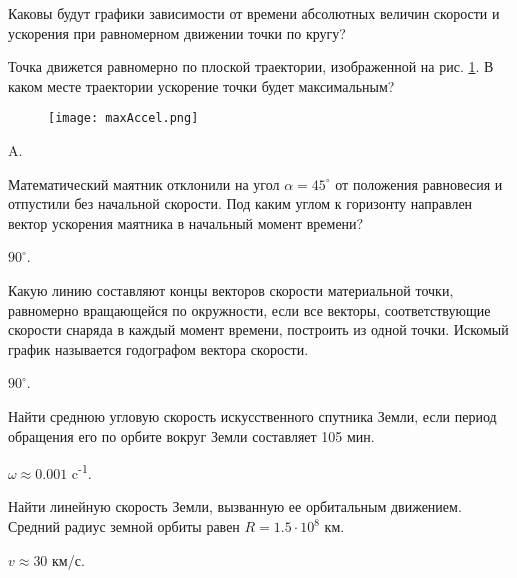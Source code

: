 \qualProblems

\begin{ex} %
Каковы будут графики зависимости от времени абсолютных величин скорости и ускорения при равномерном движении точки по кругу?
\end{ex}

\begin{ex} %
Точка движется равномерно по плоской траектории, изображенной на рис. \ref{maxAccel}. В каком месте траектории ускорение точки будет максимальным?

\begin{figure}[h]
\centering
\texttt{[image: maxAccel.png]}
\caption{}
\label{maxAccel}
\end{figure}
\begin{ans}
A.
\end{ans}
\end{ex}

\begin{ex} %
Математический маятник отклонили на угол $\alpha = 45^{\circ}$ от положения равновесия и отпустили без начальной скорости. Под каким углом к горизонту направлен вектор ускорения маятника в начальный момент времени?
\begin{ans}
$90^{\circ}$.
\end{ans}
\end{ex}

\begin{ex}
Какую линию составляют концы векторов скорости материальной точки, равномерно вращающейся по окружности, если все векторы, соответствующие скорости снаряда в каждый момент времени, построить из одной точки. Искомый график называется годографом вектора скорости.
\begin{ans}
$90^{\circ}$.
\end{ans}
\end{ex}


\simpleProblems

\begin{ex} %
Найти среднюю угловую скорость искусственного спутника Земли, если период обращения его по орбите вокруг Земли составляет 105 мин.
\begin{ans}
$\omega \approx 0.001$ c\textsuperscript{-1}.
\end{ans}
\end{ex}

\begin{ex} %
Найти линейную скорость Земли, вызванную ее орбитальным движением. Средний радиус земной орбиты равен $R = 1.5 \cdot 10^8$ км.
\begin{ans}
$v \approx 30$ км/с.
\end{ans}
\end{ex}


